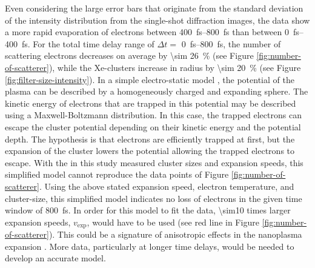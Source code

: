 Even considering the large error bars that originate from the standard deviation of the intensity distribution from the single-shot diffraction images, the data show a more rapid evaporation of electrons between \SIrange{400}{800}{\femto\second} than between \SIrange{0}{400}{\femto\second}. For the total time delay range of $\Delta t=$ \SIrange{0}{800}{\femto\second}, the number of scattering electrons decreases on average by \SI{\sim 26}{\percent} (see Figure \ref{fig:number-of-scatterer}), while the Xe-clusters increase in radius by \SI{\sim 20}{\percent} (see Figure \ref{fig:filter-size-intensity}). In a simple electro-static model \cite{Arbeiter-2010-PRA,Ditmire-1996-PRA}, the potential of the plasma can be described by a homogeneously charged and expanding sphere. The kinetic energy of electrons that are trapped in this potential may be described using a Maxwell-Boltzmann distribution. In this case, the trapped electrons can escape the cluster potential depending on their kinetic energy and the potential depth. The hypothesis is that electrons are efficiently trapped at first, but the expansion of the cluster lowers the potential allowing the trapped electrons to escape. With the in this study measured cluster sizes and expansion speeds, this simplified model cannot reproduce the data points of Figure \ref{fig:number-of-scatterer}. Using the above stated expansion speed, electron temperature, and cluster-size, this simplified model indicates no loss of electrons in the given time window of \SI{800}{\femto\second}. In order for this model to fit the data, \num{\sim10} times larger expansion speeds, $v_{\text{exp}}$, would have to be used (see red line in Figure \ref{fig:number-of-scatterer}). This could be a signature of anisotropic effects in the nanoplasma expansion \cite{Peltz-2014-PRL,Mikaberidze-2009-PRL}. More data, particularly at longer time delays, would be needed to develop an accurate model.\\[1\baselineskip]
